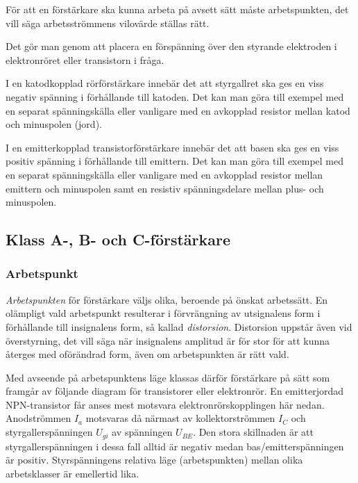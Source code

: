 För att en förstärkare ska kunna arbeta på avsett sätt måste
arbetspunkten, det vill säga arbetsströmmens vilovärde ställas rätt.

Det gör man genom att placera en förspänning över den styrande
elektroden i elektronröret eller transistorn i fråga.

I en katodkopplad rörförstärkare innebär det att styrgallret ska
ges en viss negativ spänning i förhållande till katoden.
Det kan man göra till exempel med en separat spänningskälla eller vanligare med
en avkopplad resistor mellan katod och minuspolen (jord).

I en emitterkopplad transistorförstärkare innebär det att basen ska
ges en viss positiv spänning i förhållande till emittern.
Det kan man göra till exempel med en separat spänningskälla eller vanligare med
en avkopplad resistor mellan emittern och minuspolen samt en resistiv
spänningsdelare mellan plus- och minuspolen.

\subsection{Klass A-, B- och C-förstärkare}

\subsubsection{Arbetspunkt}

\emph{Arbetspunkten} för förstärkare väljs olika, beroende på önskat arbetssätt.
En olämpligt vald arbetspunkt resulterar i förvrängning av utsignalens form i
förhållande till insignalens form, så kallad \emph{distorsion}.
Distorsion uppstår även vid överstyrning, det vill säga när insignalens
amplitud är för stor för att kunna återges med oförändrad form, även om
arbetspunkten är rätt vald.

Med avseende på arbetspunktens läge klassas därför förstärkare på sätt
som framgår av följande diagram för transistorer eller elektronrör.
En emitterjordad NPN-transistor får anses mest motsvara
elektronrörskopplingen här nedan.
Anodströmmen \(I_a\) motsvaras då närmast av kollektorströmmen
\(I_C\) och styrgallerspänningen \(U_{gi}\) av spänningen
\(U_{BE}\).
Den stora skillnaden är att styrgallerspänningen i dessa
fall alltid är negativ medan bas/emitterspänningen är positiv.
Styrspänningens relativa läge (arbetspunkten) mellan olika
arbetsklasser är emellertid lika.

